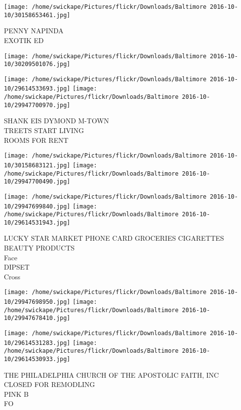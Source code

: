 \documentclass[10pt,letterpaper]{article}
\begin{document}
\vspace{0.25in}
\texttt{[image: /home/swickape/Pictures/flickr/Downloads/Baltimore 2016-10-10/30158653461.jpg]}

PENNY NAPINDA\\
EXOTIK ED\\
\pagebreak

\texttt{[image: /home/swickape/Pictures/flickr/Downloads/Baltimore 2016-10-10/30209501076.jpg]}

\vspace{0.25in}
\texttt{[image: /home/swickape/Pictures/flickr/Downloads/Baltimore 2016-10-10/29614533693.jpg]}
\texttt{[image: /home/swickape/Pictures/flickr/Downloads/Baltimore 2016-10-10/29947700970.jpg]}

SHANK EIS DYMOND M{-}TOWN\\
TREETS START LIVING\\
ROOMS FOR RENT\\
\pagebreak

\texttt{[image: /home/swickape/Pictures/flickr/Downloads/Baltimore 2016-10-10/30158683121.jpg]}
\texttt{[image: /home/swickape/Pictures/flickr/Downloads/Baltimore 2016-10-10/29947700490.jpg]}

\texttt{[image: /home/swickape/Pictures/flickr/Downloads/Baltimore 2016-10-10/29947699840.jpg]}
\texttt{[image: /home/swickape/Pictures/flickr/Downloads/Baltimore 2016-10-10/29614531943.jpg]}

LUCKY STAR MARKET PHONE CARD GROCERIES CIGARETTES BEAUTY PRODUCTS\\
Face\\
DIPSET\\
Cross\\
\pagebreak

\texttt{[image: /home/swickape/Pictures/flickr/Downloads/Baltimore 2016-10-10/29947698950.jpg]}
\texttt{[image: /home/swickape/Pictures/flickr/Downloads/Baltimore 2016-10-10/29947678410.jpg]}

\texttt{[image: /home/swickape/Pictures/flickr/Downloads/Baltimore 2016-10-10/29614531283.jpg]}
\texttt{[image: /home/swickape/Pictures/flickr/Downloads/Baltimore 2016-10-10/29614530933.jpg]}

THE PHILADELPHIA CHURCH OF THE APOSTOLIC FAITH, INC\\
CLOSED FOR REMODLING\\
PINK B\\
FO\\
\pagebreak
\end{document}
